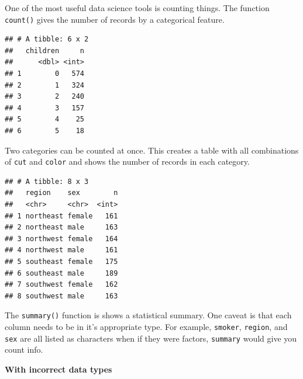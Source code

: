 \documentclass[]{book}
\newenvironment{Shaded}{\begin{snugshade}}{\end{snugshade}}
\newcommand{\KeywordTok}[1]{\textcolor[rgb]{0.13,0.29,0.53}{\textbf{#1}}}
\newcommand{\NormalTok}[1]{#1}
\newcommand{\OperatorTok}[1]{\textcolor[rgb]{0.81,0.36,0.00}{\textbf{#1}}}
\newcommand{\StringTok}[1]{\textcolor[rgb]{0.31,0.60,0.02}{#1}}
\begin{document}
One of the most useful data science tools is counting things. The function \texttt{count()} gives the number of records by a categorical feature.

\begin{Shaded}
\end{Shaded}

\begin{verbatim}
## # A tibble: 6 x 2
##   children     n
##      <dbl> <int>
## 1        0   574
## 2        1   324
## 3        2   240
## 4        3   157
## 5        4    25
## 6        5    18
\end{verbatim}

Two categories can be counted at once. This creates a table with all combinations of \texttt{cut} and \texttt{color} and shows the number of records in each category.

\begin{Shaded}
\end{Shaded}

\begin{verbatim}
## # A tibble: 8 x 3
##   region    sex        n
##   <chr>     <chr>  <int>
## 1 northeast female   161
## 2 northeast male     163
## 3 northwest female   164
## 4 northwest male     161
## 5 southeast female   175
## 6 southeast male     189
## 7 southwest female   162
## 8 southwest male     163
\end{verbatim}

The \texttt{summary()} function is shows a statistical summary. One caveat is that each column needs to be in it's appropriate type. For example, \texttt{smoker}, \texttt{region}, and \texttt{sex} are all listed as characters when if they were factors, \texttt{summary} would give you count info.

\textbf{With incorrect data types}

\begin{Shaded}
\end{Shaded}
\end{document}
